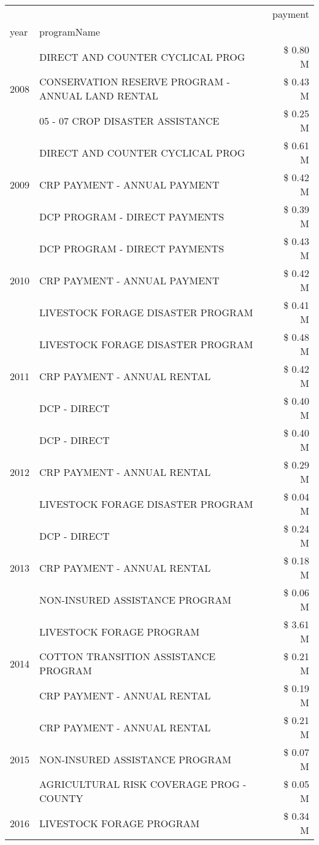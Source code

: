 \begin{tabular}{llr}
\toprule
 &  & payment \\
year & programName &  \\
\midrule
\multirow[t]{3}{*}{2008} & DIRECT AND COUNTER CYCLICAL PROG & \$ 0.80 M \\
 & CONSERVATION RESERVE PROGRAM - ANNUAL LAND RENTAL & \$ 0.43 M \\
 & 05 - 07 CROP DISASTER ASSISTANCE & \$ 0.25 M \\
\cline{1-3}
\multirow[t]{3}{*}{2009} & DIRECT AND COUNTER CYCLICAL PROG & \$ 0.61 M \\
 & CRP PAYMENT - ANNUAL PAYMENT & \$ 0.42 M \\
 & DCP PROGRAM - DIRECT PAYMENTS & \$ 0.39 M \\
\cline{1-3}
\multirow[t]{3}{*}{2010} & DCP PROGRAM - DIRECT PAYMENTS & \$ 0.43 M \\
 & CRP PAYMENT - ANNUAL PAYMENT & \$ 0.42 M \\
 & LIVESTOCK FORAGE DISASTER  PROGRAM & \$ 0.41 M \\
\cline{1-3}
\multirow[t]{3}{*}{2011} & LIVESTOCK FORAGE DISASTER PROGRAM & \$ 0.48 M \\
 & CRP PAYMENT - ANNUAL RENTAL & \$ 0.42 M \\
 & DCP - DIRECT & \$ 0.40 M \\
\cline{1-3}
\multirow[t]{3}{*}{2012} & DCP - DIRECT & \$ 0.40 M \\
 & CRP PAYMENT - ANNUAL RENTAL & \$ 0.29 M \\
 & LIVESTOCK FORAGE DISASTER PROGRAM & \$ 0.04 M \\
\cline{1-3}
\multirow[t]{3}{*}{2013} & DCP - DIRECT & \$ 0.24 M \\
 & CRP PAYMENT - ANNUAL RENTAL & \$ 0.18 M \\
 & NON-INSURED ASSISTANCE PROGRAM & \$ 0.06 M \\
\cline{1-3}
\multirow[t]{3}{*}{2014} & LIVESTOCK FORAGE PROGRAM & \$ 3.61 M \\
 & COTTON TRANSITION ASSISTANCE PROGRAM & \$ 0.21 M \\
 & CRP PAYMENT - ANNUAL RENTAL & \$ 0.19 M \\
\cline{1-3}
\multirow[t]{3}{*}{2015} & CRP PAYMENT - ANNUAL RENTAL & \$ 0.21 M \\
 & NON-INSURED ASSISTANCE PROGRAM & \$ 0.07 M \\
 & AGRICULTURAL RISK COVERAGE PROG - COUNTY & \$ 0.05 M \\
\cline{1-3}
\multirow[t]{3}{*}{2016} & LIVESTOCK FORAGE PROGRAM                      & \$ 0.34 M \\

\end{tabular}
